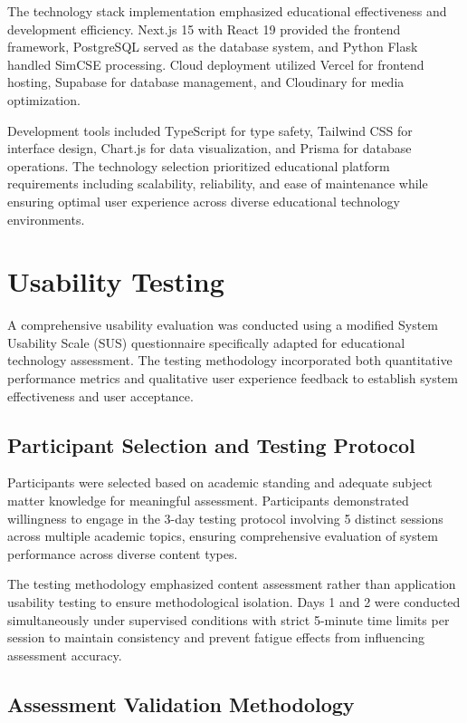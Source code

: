 {The technology stack implementation emphasized educational effectiveness and development efficiency. Next.js 15 with React 19 provided the frontend framework, PostgreSQL served as the database system, and Python Flask handled SimCSE processing. Cloud deployment utilized Vercel for frontend hosting, Supabase for database management, and Cloudinary for media optimization.

Development tools included TypeScript for type safety, Tailwind CSS for interface design, Chart.js for data visualization, and Prisma for database operations. The technology selection prioritized educational platform requirements including scalability, reliability, and ease of maintenance while ensuring optimal user experience across diverse educational technology environments.
}

{\color{maroon}
\section{Usability Testing}
\label{sec:usability_testing}

A comprehensive usability evaluation was conducted using a modified System Usability Scale (SUS) questionnaire specifically adapted for educational technology assessment. The testing methodology incorporated both quantitative performance metrics and qualitative user experience feedback to establish system effectiveness and user acceptance.

\subsection{Participant Selection and Testing Protocol}

Participants were selected based on academic standing and adequate subject matter knowledge for meaningful assessment. Participants demonstrated willingness to engage in the 3-day testing protocol involving 5 distinct sessions across multiple academic topics, ensuring comprehensive evaluation of system performance across diverse content types.

The testing methodology emphasized content assessment rather than application usability testing to ensure methodological isolation. Days 1 and 2 were conducted simultaneously under supervised conditions with strict 5-minute time limits per session to maintain consistency and prevent fatigue effects from influencing assessment accuracy.

\subsection{Assessment Validation Methodology}

}
